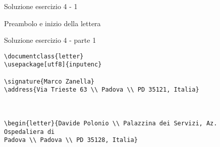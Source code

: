 \begin{frame}[fragile]{Soluzione esercizio 4 - 1}

Preambolo e inizio della lettera
\begin{block}{Soluzione esercizio 4 - parte 1}
\begin{lstlisting}
\documentclass{letter}
\usepackage[utf8]{inputenc}

\signature{Marco Zanella}
\address{Via Trieste 63 \\ Padova \\ PD 35121, Italia}



\begin{letter}{Davide Polonio \\ Palazzina dei Servizi, Az. Ospedaliera di 
Padova \\ Padova \\ PD 35128, Italia}
\end{lstlisting}
\end{block}

\end{frame}